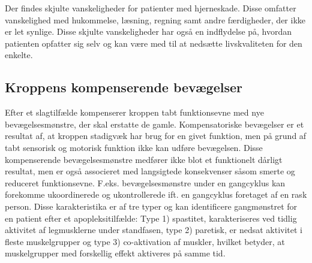 Der findes skjulte vanskeligheder for patienter med hjerneskade. Disse omfatter vanskelighed med hukommelse, læsning, regning samt andre færdigheder, der ikke er let synlige. Disse skjulte vanskeligheder har også en indflydelse på, hvordan patienten opfatter sig selv og kan være med til at nedsætte livskvaliteten for den enkelte.\cite{Sundhedsstyrelsen2010} 

\subsection{Kroppens kompenserende bevægelser}
Efter et slagtilfælde kompenserer kroppen tabt funktionsevne med nye bevægelsesmønstre, der skal erstatte de gamle. Kompensatoriske bevægelser er et resultat af, at kroppen stadigvæk har brug for en givet funktion, men på grund af tabt sensorisk og motorisk funktion ikke kan udføre bevægelsen. Disse kompenserende bevægelsesmønstre medfører ikke blot et funktionelt dårligt resultat, men er også associeret med langsigtede konsekvenser såsom smerte og reduceret funktionsevne. \cite{Takeuchi2012, Leea2009} F.eks. bevægelsesmønstre under en gangcyklus kan forekomme ukoordinerede og ukontrollerede ift. en gangcyklus foretaget af en rask person. Disse karakteristika er af tre typer og kan identificere gangmønstret for en patient efter et apopleksitilfælde: Type 1) spastitet, karakteriseres ved tidlig aktivitet af legmusklerne under standfasen, type 2) paretisk, er nedsat aktivitet i fleste muskelgrupper og type 3) co-aktivation af muskler, hvilket betyder, at muskelgrupper med forskellig effekt aktiveres på samme tid. \cite{Lamontagne2006}
 



